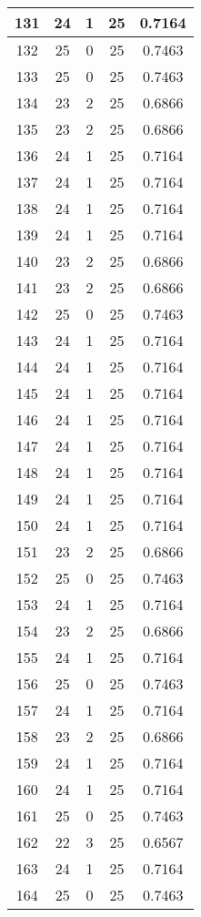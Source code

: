\documentclass[letterpaper, 12pt]{article}
\begin{document}
\begin{longtable}{|c|c|c|c|c|}
\hline
131 & 24 & 1 & 25 & 0.7164 \\
\hline
132 & 25 & 0 & 25 & 0.7463 \\
\hline
133 & 25 & 0 & 25 & 0.7463 \\
\hline
134 & 23 & 2 & 25 & 0.6866 \\
\hline
135 & 23 & 2 & 25 & 0.6866 \\
\hline
136 & 24 & 1 & 25 & 0.7164 \\
\hline
137 & 24 & 1 & 25 & 0.7164 \\
\hline
138 & 24 & 1 & 25 & 0.7164 \\
\hline
139 & 24 & 1 & 25 & 0.7164 \\
\hline
140 & 23 & 2 & 25 & 0.6866 \\
\hline
141 & 23 & 2 & 25 & 0.6866 \\
\hline
142 & 25 & 0 & 25 & 0.7463 \\
\hline
143 & 24 & 1 & 25 & 0.7164 \\
\hline
144 & 24 & 1 & 25 & 0.7164 \\
\hline
145 & 24 & 1 & 25 & 0.7164 \\
\hline
146 & 24 & 1 & 25 & 0.7164 \\
\hline
147 & 24 & 1 & 25 & 0.7164 \\
\hline
148 & 24 & 1 & 25 & 0.7164 \\
\hline
149 & 24 & 1 & 25 & 0.7164 \\
\hline
150 & 24 & 1 & 25 & 0.7164 \\
\hline
151 & 23 & 2 & 25 & 0.6866 \\
\hline
152 & 25 & 0 & 25 & 0.7463 \\
\hline
153 & 24 & 1 & 25 & 0.7164 \\
\hline
154 & 23 & 2 & 25 & 0.6866 \\
\hline
155 & 24 & 1 & 25 & 0.7164 \\
\hline
156 & 25 & 0 & 25 & 0.7463 \\
\hline
157 & 24 & 1 & 25 & 0.7164 \\
\hline
158 & 23 & 2 & 25 & 0.6866 \\
\hline
159 & 24 & 1 & 25 & 0.7164 \\
\hline
160 & 24 & 1 & 25 & 0.7164 \\
\hline
161 & 25 & 0 & 25 & 0.7463 \\
\hline
162 & 22 & 3 & 25 & 0.6567 \\
\hline
163 & 24 & 1 & 25 & 0.7164 \\
\hline
164 & 25 & 0 & 25 & 0.7463 \\

\end{longtable}
\end{document}
